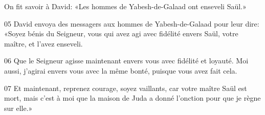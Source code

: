 On fit savoir à David: «Les hommes de Yabesh-de-Galaad ont enseveli Saül.»

05 David envoya des messagers aux hommes de Yabesh-de-Galaad pour leur dire: «Soyez bénis du Seigneur, vous qui avez agi avec fidélité envers Saül, votre maître, et l’avez enseveli.

06 Que le Seigneur agisse maintenant envers vous avec fidélité et loyauté. Moi aussi, j’agirai envers vous avec la même bonté, puisque vous avez fait cela.

07 Et maintenant, reprenez courage, soyez vaillants, car votre maître Saül est mort, mais c’est à moi que la maison de Juda a donné l’onction pour que je règne sur elle.»
